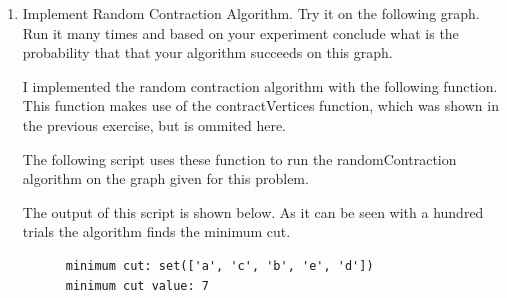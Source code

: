 \documentclass[11pt, oneside]{article}
\begin{document}
\begin{enumerate}
  \item %
    Implement Random Contraction Algorithm.
    Try it on the following graph. 
    Run it many times and based on your experiment conclude what is the probability that that your algorithm succeeds on this graph.
    \begin{center}
    \end{center}

    I implemented the random contraction algorithm with the following function.
    This function makes use of the contractVertices function, which was shown
    in the previous exercise, but is ommited here.
    

    The following script uses these function to run the randomContraction
    algorithm on the graph given for this problem.
    

    The output of this script is shown below.
    As it can be seen with a hundred trials the algorithm finds the minimum
    cut.
    \begin{verbatim}
      minimum cut: set(['a', 'c', 'b', 'e', 'd'])
      minimum cut value: 7
    \end{verbatim}


\end{enumerate}
\end{document}
